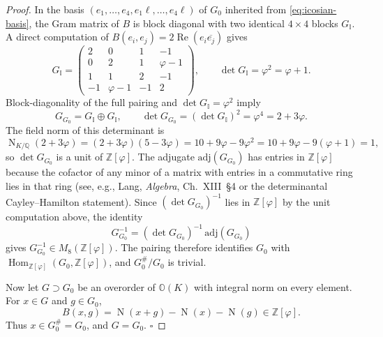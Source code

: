 \documentclass[12pt,oneside,english]{amsart}
\numberwithin{equation}{section}
\numberwithin{figure}{section}
\numberwithin{table}{section}
\theoremstyle{plain}
\theoremstyle{definition}
\theoremstyle{remark}
\newcommand{\QQ}{\mathbb Q}
\newcommand{\Oct}{\mathbb O}
\newcommand{\Zphi}{\mathbb Z[\varphi]}
\newcommand{\Norm}{\operatorname{N}}
\newcommand{\Rea}{\operatorname{Re}}
\begin{document}
\begin{proof}
In the basis \((e_1,\ldots,e_4,e_1\ell,\ldots,e_4\ell)\) of \(G_0\) inherited from \eqref{eq:icosian-basis}, the Gram matrix of \(B\) is block diagonal with two identical \(4\times 4\) blocks \(G_{\mathbb I}\). A direct computation of \(B(e_i,e_j)=2\Rea(e_i\overline{e_j})\) gives
\begin{equation}
G_{\mathbb I}=
\begin{pmatrix}
2 & 0 & 1 & -1 \\
0 & 2 & 1 & \varphi-1 \\
1 & 1 & 2 & -1 \\
-1 & \varphi-1 & -1 & 2
\end{pmatrix},
\qquad
\det G_{\mathbb I}=\varphi^{2}=\varphi+1.
\label{eq:gram-icosian}
\end{equation}
Block-diagonality of the full pairing and \(\det G_{\mathbb I}=\varphi^{2}\) imply
\begin{equation}
G_{G_0}=G_{\mathbb I}\oplus G_{\mathbb I},
\qquad
\det G_{G_0}=(\det G_{\mathbb I})^{2}=\varphi^{4}=2+3\varphi.
\label{eq:gram-g0}
\end{equation}
The field norm of this determinant is
\begin{equation}
\Norm_{K/\QQ}(2+3\varphi)=(2+3\varphi)(5-3\varphi)=10+9\varphi-9\varphi^2=10+9\varphi-9(\varphi+1)=1,
\end{equation}
so \(\det G_{G_0}\) is a unit of \(\Zphi\). The adjugate \(\mathrm{adj}(G_{G_0})\) has entries in \(\Zphi\) because the cofactor of any minor of a matrix with entries in a commutative ring lies in that ring (see, e.g., Lang, \emph{Algebra}, Ch.~XIII~\S4 or the determinantal Cayley--Hamilton statement). Since \((\det G_{G_0})^{-1}\) lies in \(\Zphi\) by the unit computation above, the identity
\begin{equation}
G_{G_0}^{-1}=(\det G_{G_0})^{-1}\,\mathrm{adj}(G_{G_0})
\end{equation}
gives \(G_{G_0}^{-1}\in M_{8}(\Zphi)\). The pairing therefore identifies \(G_0\) with \(\operatorname{Hom}_{\Zphi}(G_0,\Zphi)\), and \(G_0^\#/G_0\) is trivial.

Now let \(G\supset G_0\) be an overorder of \(\Oct(K)\) with integral norm on every element. For \(x\in G\) and \(g\in G_0\),
\begin{equation}
B(x,g)=\Norm(x+g)-\Norm(x)-\Norm(g)\in\Zphi.
\end{equation}
Thus \(x\in G_0^\#=G_0\), and \(G=G_0\). \(\square\)
\end{proof}
\end{document}
